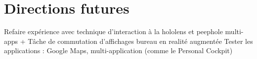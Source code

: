 \chapter{Directions futures}
\label{ch:futur_work}

Refaire expérience avec technique d'interaction à la hololens et peephole
multi-apps + Tâche de commutation d'affichages
bureau en realité augmentée
Tester les applications : Google Maps, multi-application (comme le Personal Cockpit)